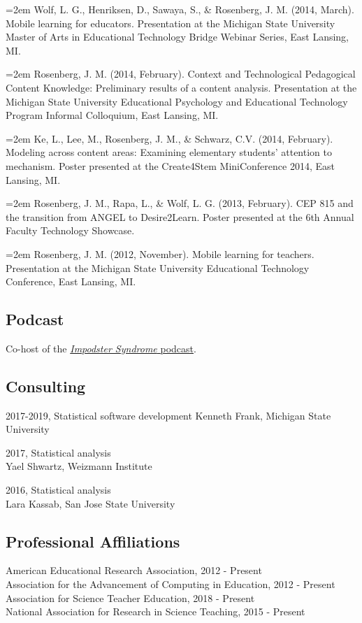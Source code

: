\documentclass[14,]{article}
\begin{document}
\hangindent=2em Wolf, L. G., Henriksen, D., Sawaya, S., \& Rosenberg, J.
M. (2014, March). Mobile learning for educators. Presentation at the
Michigan State University Master of Arts in Educational Technology
Bridge Webinar Series, East Lansing, MI.

\hangindent=2em Rosenberg, J. M. (2014, February). Context and
Technological Pedagogical Content Knowledge: Preliminary results of a
content analysis. Presentation at the Michigan State University
Educational Psychology and Educational Technology Program Informal
Colloquium, East Lansing, MI.

\hangindent=2em Ke, L., Lee, M., Rosenberg, J. M., \& Schwarz, C.V.
(2014, February). Modeling across content areas: Examining elementary
students' attention to mechanism. Poster presented at the Create4Stem
MiniConference 2014, East Lansing, MI.

\hangindent=2em Rosenberg, J. M., Rapa, L., \& Wolf, L. G. (2013,
February). CEP 815 and the transition from ANGEL to Desire2Learn. Poster
presented at the 6th Annual Faculty Technology Showcase.

\hangindent=2em Rosenberg, J. M. (2012, November). Mobile learning for
teachers. Presentation at the Michigan State University Educational
Technology Conference, East Lansing, MI.

\hypertarget{podcast}{%
\subsection{Podcast}\label{podcast}}

Co-host of the
\href{http://impodstersyndrome.libsyn.com/}{\emph{Impodster Syndrome}
podcast}.

\hypertarget{consulting}{%
\subsection{Consulting}\label{consulting}}

2017-2019, Statistical software development Kenneth Frank, Michigan
State University

2017, Statistical analysis\\
Yael Shwartz, Weizmann Institute

2016, Statistical analysis\\
Lara Kassab, San Jose State University

\hypertarget{professional-affiliations}{%
\subsection{Professional Affiliations}\label{professional-affiliations}}

American Educational Research Association, 2012 - Present\\
Association for the Advancement of Computing in Education, 2012 -
Present\\
Association for Science Teacher Education, 2018 - Present\\
National Association for Research in Science Teaching, 2015 - Present
\end{document}
